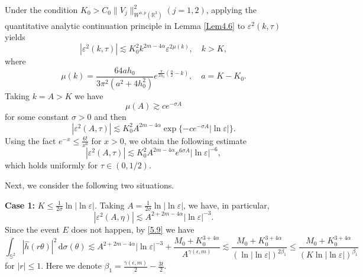 \documentclass[reqno, 12pt]{amsart}
\numberwithin{equation}{section}
\begin{document}
 Under the condition $K_0>C_0\|V_j\|^2_{W^{\alpha,p}(\mathbb R^3)} (j=1,2)$, applying the quantitative analytic continuation principle in Lemma \ref{Lem4.6} to $\varepsilon^2(k, \tau )$ yields
	\[
	|\varepsilon^2(k, \tau )|\lesssim K_0^2 k^{2m-4\alpha}\varepsilon^{2\mu({k})},\quad {k}>K,
	\]
	where 
	\[
	\mu({k})=\frac{64ah_0}{3\pi^2(a^2+4h_0^2)}e^{\frac{\pi}{2 h_0}(\frac{a}{2}-{k})}, \quad a = K - K_0.
	\]
	Taking $k=A>K$ we have
	\[
	\mu({A})\gtrsim ce^{-\sigma A}
	\]
	for some constant $\sigma>0$ and then
	\[
	|\varepsilon^2(A,\tau)|\lesssim K_0^2 A^{2m-4\alpha} \exp\{-ce^{-\sigma A}|\ln \varepsilon|\}.
	\]
	Using the fact 
	$e^{-x}\leq\frac{6!}{x^{6}}$ for $x>0$, we obtain the following estimate
	\[
	|\varepsilon^2(A,\tau)|\lesssim K_0^2 
    A^{2m-4\alpha} e^{6\sigma A}|\ln \varepsilon|^{-6},
	\]
	which holds uniformly for $\tau\in (0, 1/2)$. 
		
	Next, we consider the following two situations.
    
	\textbf{Case 1:} $K\leq \frac{1}{2\sigma}\ln|\ln \varepsilon|$.
	Taking $A=\frac{1}{2\sigma}\ln|\ln \varepsilon|$, we have, in particular,
	\[
	|\varepsilon^2(A,  \eta )|\lesssim A^{2+2m-4\alpha}|\ln\varepsilon|^{-3}.
	\]
	Since the event $E$ does not happen, by \eqref{5.9} we have
	\[
	\int_{\mathbb S^2}| \hat{h}(  r \theta)|^2\,\mathrm{d}\sigma(\theta)\lesssim A^{2+2m-4\alpha}|\ln\varepsilon|^{-3}+\frac{M_0+K_0^{3+4\alpha}}{A^{\gamma(\epsilon,m)}}\lesssim \frac{M_0+K_0^{3+4\alpha}}{(\ln|\ln\varepsilon|)^{2\beta_1}} \le \frac{M_0+K_0^{3+4\alpha}}{(K\ln|\ln\varepsilon|)^{\beta_1}}
	\]
	for $| r|\le 1$.
	Here we denote $\beta_1=\frac{\gamma(\epsilon,m)}{2}  - \frac{3t}{2}$.
    
\end{document}
